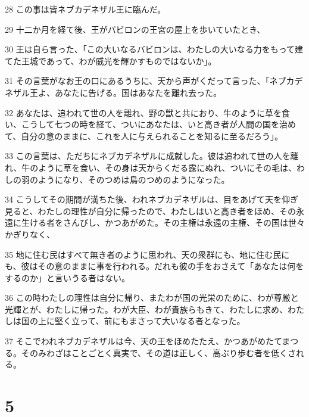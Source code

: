 \par 28 この事は皆ネブカデネザル王に臨んだ。
\par 29 十二か月を経て後、王がバビロンの王宮の屋上を歩いていたとき、
\par 30 王は自ら言った、「この大いなるバビロンは、わたしの大いなる力をもって建てた王城であって、わが威光を輝かすものではないか」。
\par 31 その言葉がなお王の口にあるうちに、天から声がくだって言った、「ネブカデネザル王よ、あなたに告げる。国はあなたを離れ去った。
\par 32 あなたは、追われて世の人を離れ、野の獣と共におり、牛のように草を食い、こうして七つの時を経て、ついにあなたは、いと高き者が人間の国を治めて、自分の意のままに、これを人に与えられることを知るに至るだろう」。
\par 33 この言葉は、ただちにネブカデネザルに成就した。彼は追われて世の人を離れ、牛のように草を食い、その身は天からくだる露にぬれ、ついにその毛は、わしの羽のようになり、そのつめは鳥のつめのようになった。
\par 34 こうしてその期間が満ちた後、われネブカデネザルは、目をあげて天を仰ぎ見ると、わたしの理性が自分に帰ったので、わたしはいと高き者をほめ、その永遠に生ける者をさんびし、かつあがめた。その主権は永遠の主権、その国は世々かぎりなく、
\par 35 地に住む民はすべて無き者のように思われ、天の衆群にも、地に住む民にも、彼はその意のままに事を行われる。だれも彼の手をおさえて「あなたは何をするのか」と言いうる者はない。
\par 36 この時わたしの理性は自分に帰り、またわが国の光栄のために、わが尊厳と光輝とが、わたしに帰った。わが大臣、わが貴族らもきて、わたしに求め、わたしは国の上に堅く立って、前にもまさって大いなる者となった。
\par 37 そこでわれネブカデネザルは今、天の王をほめたたえ、かつあがめたてまつる。そのみわざはことごとく真実で、その道は正しく、高ぶり歩む者を低くされる。

\chapter{5}

